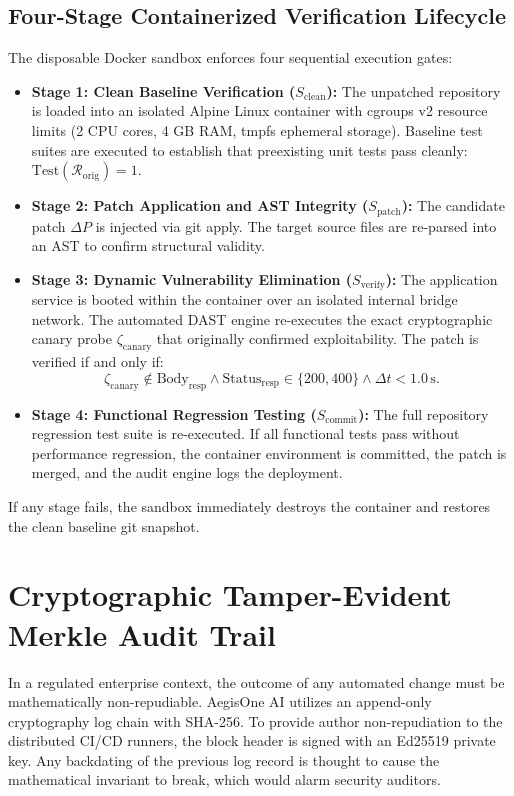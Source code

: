 \documentclass[journal,twoside]{IEEEtran}
\begin{document}
\subsection{Four-Stage Containerized Verification Lifecycle}
The disposable Docker sandbox enforces four sequential execution gates:
\begin{itemize}
    \item \textbf{Stage 1: Clean Baseline Verification ($S_{\text{clean}}$):} The unpatched repository is loaded into an isolated Alpine Linux container with cgroups v2 resource limits (2 CPU cores, 4 GB RAM, tmpfs ephemeral storage). Baseline test suites are executed to establish that preexisting unit tests pass cleanly: $\text{Test}(\mathcal{R}_{\text{orig}}) = 1$.
    \item \textbf{Stage 2: Patch Application and AST Integrity ($S_{\text{patch}}$):} The candidate patch $\Delta P$ is injected via git apply. The target source files are re-parsed into an AST to confirm structural validity.
    \item \textbf{Stage 3: Dynamic Vulnerability Elimination ($S_{\text{verify}}$):} The application service is booted within the container over an isolated internal bridge network. The automated DAST engine re-executes the exact cryptographic canary probe $\zeta_{\text{canary}}$ that originally confirmed exploitability. The patch is verified if and only if:
    \begin{equation}
    \zeta_{\text{canary}} \notin \text{Body}_{\text{resp}} \wedge \text{Status}_{\text{resp}} \in \{200, 400\} \wedge \Delta t < 1.0\,\text{s}.
    \end{equation}
    \item \textbf{Stage 4: Functional Regression Testing ($S_{\text{commit}}$):} The full repository regression test suite is re-executed. If all functional tests pass without performance regression, the container environment is committed, the patch is merged, and the audit engine logs the deployment.
\end{itemize}
If any stage fails, the sandbox immediately destroys the container and restores the clean baseline git snapshot.

\section{Cryptographic Tamper-Evident Merkle Audit Trail}
In a regulated enterprise context, the outcome of any automated change must be mathematically non-repudiable. AegisOne AI utilizes an append-only cryptography log chain with SHA-256. To provide author non-repudiation to the distributed CI/CD runners, the block header is signed with an Ed25519 private key. Any backdating of the previous log record is thought to cause the mathematical invariant to break, which would alarm security auditors.
\end{document}
